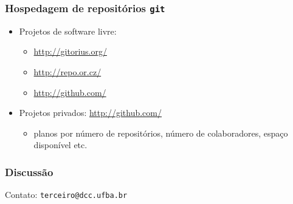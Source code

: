 \documentclass{beamer}
\newcommand{\git}{\texttt{git}}
\begin{document}
\begin{frame}
  \frametitle{Hospedagem de repositórios \git}
  \begin{itemize}
    \item Projetos de software livre:
      \begin{itemize}
        \item \url{http://gitorius.org/}
        \item \url{http://repo.or.cz/}
        \item \url{http://github.com/}
      \end{itemize}

    \item Projetos privados: \url{http://github.com/}
      \begin{itemize}
        \item planos por número de repositórios, número de
          colaboradores, espaço disponível etc.
      \end{itemize}
  \end{itemize}
\end{frame}

\begin{frame}
  \frametitle{Discussão}
  \begin{center}
    Contato: \texttt{terceiro@dcc.ufba.br}
  \end{center}
\end{frame}
\end{document}
